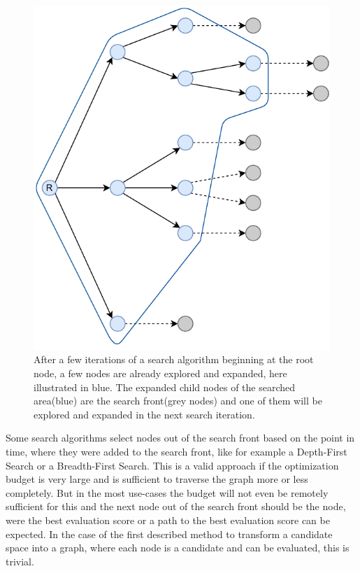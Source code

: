 \begin{figure}[ht!]
    \centering
    \includegraphics[width=\textwidth]{gfx/Figures/Theory/GraphSearchFront.pdf}
    \caption{After a few iterations of a search algorithm beginning at the root node, a few nodes are already explored and expanded, here illustrated in blue. The expanded child nodes of the searched area(blue) are the search front(grey nodes) and one of them will be explored and expanded in the next search iteration.}
    \label{fig:theory:graph-search-front}
\end{figure}
Some search algorithms select nodes out of the search front  based on the point in time, where they were added to the search front, like for example a Depth-First Search or a Breadth-First Search.
This is a valid approach if the optimization budget is very large and is sufficient to traverse the graph more or less completely.
But in the most use-cases the budget will not even be remotely sufficient for this and the next node out of the search front should be the node, were the best evaluation score or a path to the best evaluation score can be expected.\newline
In the case of the first described method to transform a candidate space into a graph, where each node is a candidate and can be evaluated, this is trivial.
